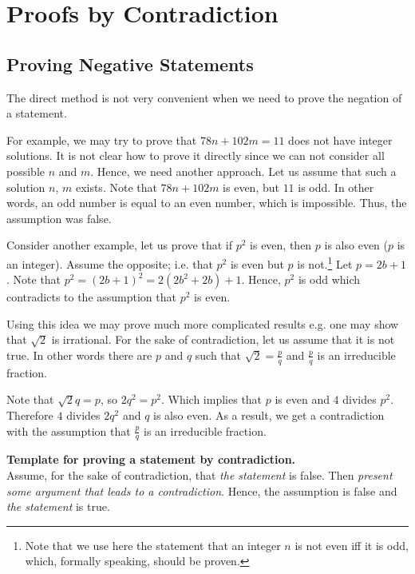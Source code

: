 \chapter{Proofs by Contradiction}
\label{chapter:indirect-proofs}
\section{Proving Negative Statements}
The direct method is not very convenient when we need to prove the negation of
a statement.

For example, we may try to prove that $78 n + 102 m = 11$ does not have integer
solutions. It is not clear how to prove it directly since we can not consider
all possible $n$ and $m$. Hence, we need another approach. Let us assume that
such a solution $n$, $m$ exists. Note that $78 n + 102 m$ is even, but $11$ is
odd. In other words, an odd number is equal to an even number, which is
impossible. Thus, the assumption was false.

Consider another example, let us prove that if $p^2$ is even, then
$p$ is also even ($p$ is an integer). Assume the opposite; i.e. that $p^2$ is
even but $p$ is not.\footnote{%
  Note that we use here the statement that an integer $n$ is not even iff it is
  odd, which, formally speaking, should be proven.
}
Let $p = 2b + 1$. Note that $p^2 = (2b + 1)^2 = 2(2b^2 + 2b) + 1$.
Hence, $p^2$ is odd which contradicts to the assumption that $p^2$ is even.

Using this idea we may prove much more complicated results e.g. one may show
that $\sqrt{2}$ is irrational. For the sake of contradiction, let us assume
that it is not true. In other words there are $p$ and $q$ such that
$\sqrt{2} = \frac{p}{q}$ and $\frac{p}{q}$ is an irreducible fraction.

Note that $\sqrt{2} q = p$, so $2q^2 = p^2$. Which implies that $p$ is even
and $4$ divides $p^2$. Therefore $4$ divides $2q^2$ and $q$ is also even. As
a result, we get a contradiction with the assumption that $\frac{p}{q}$ is an
irreducible fraction.

\begin{template}
  \textbf{Template for proving a statement by contradiction.} \\

  Assume, for the sake of contradiction, that \emph{the statement} is false.
  Then \emph{present some argument that leads to a contradiction}. Hence, the
  assumption is false and \emph{the statement} is true.
\end{template}

